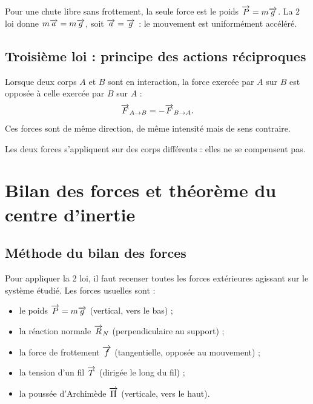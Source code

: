 \begin{exemple}
Pour une chute libre sans frottement, la seule force est le poids $\overrightarrow{P}=m\overrightarrow{g}$. La 2\ieme{} loi donne $m\overrightarrow{a}=m\overrightarrow{g}$, soit $\overrightarrow{a}=\overrightarrow{g}$ : le mouvement est uniformément accéléré.
\end{exemple}

\subsection{Troisième loi : principe des actions réciproques}

\begin{loi}
Lorsque deux corps $A$ et $B$ sont en interaction, la force exercée par $A$ sur $B$ est opposée à celle exercée par $B$ sur $A$ :
\[
\overrightarrow{F}_{A\to B} = -\overrightarrow{F}_{B\to A}.
\]
Ces forces sont de même direction, de même intensité mais de sens contraire.
\end{loi}

\begin{remarque}
Les deux forces s’appliquent sur des corps différents : elles ne se compensent pas.
\end{remarque}

\section{Bilan des forces et théorème du centre d’inertie}

\subsection{Méthode du bilan des forces}

Pour appliquer la 2\ieme{} loi, il faut recenser toutes les forces extérieures agissant sur le système étudié. Les forces usuelles sont :
\begin{itemize}
\item le poids $\overrightarrow{P}=m\overrightarrow{g}$ (vertical, vers le bas) ;
\item la réaction normale $\overrightarrow{R}_N$ (perpendiculaire au support) ;
\item la force de frottement $\overrightarrow{f}$ (tangentielle, opposée au mouvement) ;
\item la tension d’un fil $\overrightarrow{T}$ (dirigée le long du fil) ;
\item la poussée d’Archimède $\overrightarrow{\Pi}$ (verticale, vers le haut).
\end{itemize}

